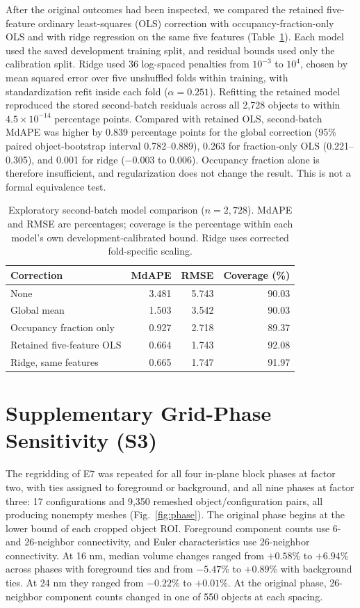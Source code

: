 \documentclass[journal]{IEEEtran}
\begin{document}
After the original outcomes had been inspected, we compared the retained five-feature ordinary least-squares (OLS) correction with occupancy-fraction-only OLS and with ridge regression on the same five features (Table~\ref{tab:model_sensitivity}). Each model used the saved development training split, and residual bounds used only the calibration split. Ridge used 36 log-spaced penalties from $10^{-3}$ to $10^4$, chosen by mean squared error over five unshuffled folds within training, with standardization refit inside each fold ($\alpha=0.251$). Refitting the retained model reproduced the stored second-batch residuals across all 2,728 objects to within $4.5\times10^{-14}$ percentage points. Compared with retained OLS, second-batch MdAPE was higher by 0.839 percentage points for the global correction (95\% paired object-bootstrap interval 0.782--0.889), 0.263 for fraction-only OLS (0.221--0.305), and 0.001 for ridge ($-0.003$ to 0.006). Occupancy fraction alone is therefore insufficient, and regularization does not change the result. This is not a formal equivalence test.

\begin{table}[t]
\centering
\caption{Exploratory second-batch model comparison ($n=2{,}728$). MdAPE and RMSE are percentages; coverage is the percentage within each model's own development-calibrated bound. Ridge uses corrected fold-specific scaling.}
\label{tab:model_sensitivity}
\begin{tabular}{lrrr}
\toprule
Correction & MdAPE & RMSE & Coverage (\%) \\
\midrule
None & 3.481 & 5.743 & 90.03 \\
Global mean & 1.503 & 3.542 & 90.03 \\
Occupancy fraction only & 0.927 & 2.718 & 89.37 \\
Retained five-feature OLS & 0.664 & 1.743 & 92.08 \\
Ridge, same features & 0.665 & 1.747 & 91.97 \\
\bottomrule
\end{tabular}
\end{table}

\section{Supplementary Grid-Phase Sensitivity (S3)}\label{app:phase}

The regridding of E7 was repeated for all four in-plane block phases at factor two, with ties assigned to foreground or background, and all nine phases at factor three: 17 configurations and 9,350 remeshed object/configuration pairs, all producing nonempty meshes (Fig.~\ref{fig:phase}). The original phase begins at the lower bound of each cropped object ROI. Foreground component counts use 6- and 26-neighbor connectivity, and Euler characteristics use 26-neighbor connectivity. At 16 nm, median volume changes ranged from $+0.58$\% to $+6.94$\% across phases with foreground ties and from $-5.47$\% to $+0.89$\% with background ties. At 24 nm they ranged from $-0.22$\% to $+0.01$\%. At the original phase, 26-neighbor component counts changed in one of 550 objects at each spacing.
\end{document}
